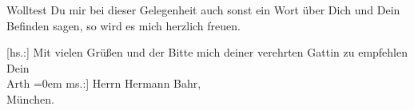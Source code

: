 \pstart
           Wolltest Du mir bei dieser Gelegenheit auch sonst ein Wort über Dich und Dein
               Befinden sagen, so wird es mich herzlich freuen.\pend
           
\pstart
           {[}hs.:{]} Mit vielen Grüßen und der Bitte mich deiner verehrten Gattin zu empfehlen{\\[\baselineskip]}Dein{\\[\baselineskip]}\spacefill\mbox{Arth}\pend
           \leftskip=0em{}
\pstart
           \noindent{}{[}ms.:{]}  Herrn Hermann Bahr,{\\}München.\pend
           \endnumbering{}  
      